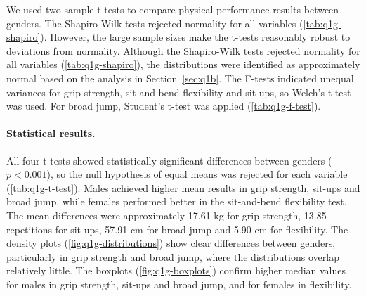We used two-sample t-tests to compare physical performance results between genders.
The Shapiro-Wilk tests rejected normality for all variables (\autoref{tab:q1g-shapiro}). However, the large sample sizes make the t-tests reasonably robust to deviations from normality.
Although the Shapiro-Wilk tests rejected normality for all variables (\autoref{tab:q1g-shapiro}), the distributions were identified as approximately normal based on the analysis in Section~\ref{sec:q1b}.
The F-tests indicated unequal variances for grip strength, sit-and-bend flexibility and sit-ups, so Welch's t-test was used.
For broad jump, Student's t-test was applied (\autoref{tab:q1g-f-test}).

\paragraph{Statistical results.}
All four t-tests showed statistically significant differences between genders ($p < 0.001$), so the null hypothesis of equal means was rejected for each variable (\autoref{tab:q1g-t-test}).
Males achieved higher mean results in grip strength, sit-ups and broad jump, while females performed better in the sit-and-bend flexibility test. The mean differences were approximately 17.61 kg for grip strength, 13.85 repetitions for sit-ups, 57.91 cm for broad jump and 5.90 cm for flexibility.
The density plots (\autoref{fig:q1g-distributions}) show clear differences between genders, particularly in grip strength and broad jump, where the distributions overlap relatively little.
The boxplots (\autoref{fig:q1g-boxplots}) confirm higher median values for males in grip strength, sit-ups and broad jump, and for females in flexibility.
